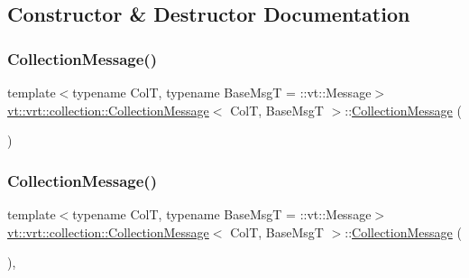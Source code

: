 \subsection{Constructor \& Destructor Documentation}
\mbox{\label{structvt_1_1vrt_1_1collection_1_1_collection_message_a67157cfe91f1138728cf8c4ea14a0778}} 
\subsubsection{\texorpdfstring{Collection\+Message()}{CollectionMessage()}\hspace{0.1cm}{\footnotesize\ttfamily [1/2]}}
{\footnotesize\ttfamily template$<$typename ColT, typename Base\+MsgT = \+::vt\+::\+Message$>$ \\
\hyperlink{structvt_1_1vrt_1_1collection_1_1_collection_message}{vt\+::vrt\+::collection\+::\+Collection\+Message}$<$ ColT, Base\+MsgT $>$\+::\hyperlink{structvt_1_1vrt_1_1collection_1_1_collection_message}{Collection\+Message} (\begin{DoxyParamCaption}{ }\end{DoxyParamCaption})\hspace{0.3cm}{\ttfamily [default]}}

\mbox{\label{structvt_1_1vrt_1_1collection_1_1_collection_message_a8012bc5471893e2daedeab8aa4ed1509}} 
\subsubsection{\texorpdfstring{Collection\+Message()}{CollectionMessage()}\hspace{0.1cm}{\footnotesize\ttfamily [2/2]}}
{\footnotesize\ttfamily template$<$typename ColT, typename Base\+MsgT = \+::vt\+::\+Message$>$ \\
\hyperlink{structvt_1_1vrt_1_1collection_1_1_collection_message}{vt\+::vrt\+::collection\+::\+Collection\+Message}$<$ ColT, Base\+MsgT $>$\+::\hyperlink{structvt_1_1vrt_1_1collection_1_1_collection_message}{Collection\+Message} (\begin{DoxyParamCaption}\item[{Col\+Msg\+Wrap\+Tag\+Type}]{ }\end{DoxyParamCaption})\hspace{0.3cm}{\ttfamily [inline]}, {\ttfamily [explicit]}}



